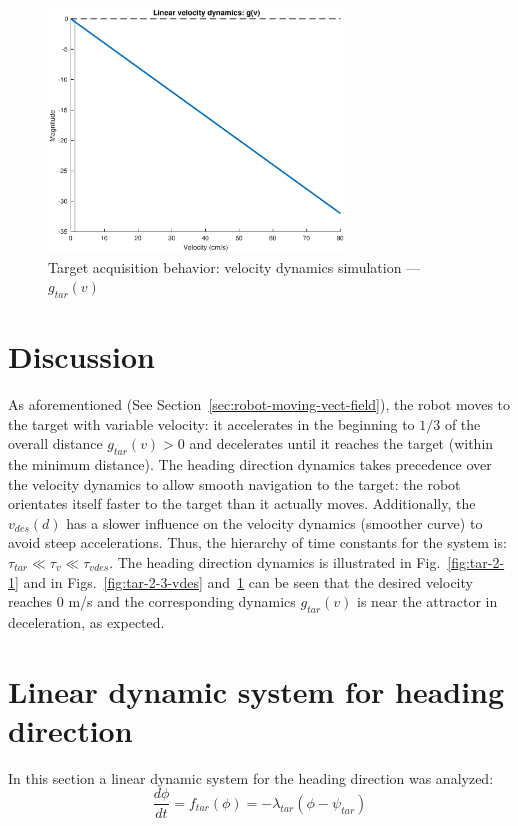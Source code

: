 %
\begin{figure}[!hbt]
\centering
    \includegraphics[width=0.7\textwidth]{./img/2-3-g-v.eps}
  \caption{Target acquisition behavior: velocity dynamics simulation ---
    $g_{tar} (v)$}%
\label{fig:tar-2-3-g-v}
\end{figure}
%
\section{Discussion}%
\label{sec:discussion-tar-nonl}
As aforementioned (See Section~\ref{sec:robot-moving-vect-field}), the robot
moves to the target with variable velocity: it accelerates in the beginning to
$1/3$ of the overall distance $g_{tar}(v) > 0$ and decelerates until it reaches
the target (within the minimum distance).
The heading direction dynamics takes precedence
over the velocity dynamics to allow smooth navigation to the target: the robot
orientates itself faster to the target than it actually moves. 
Additionally, the $v_{des}(d)$ has a slower influence on the
velocity dynamics (smoother curve) to avoid steep accelerations.
Thus, the hierarchy of time constants for the system is: $\tau_{tar} \ll \tau_{v}
\ll \tau_{vdes}$.
The heading direction dynamics is illustrated in Fig.~\ref{fig:tar-2-1} and
in Figs.~\ref{fig:tar-2-3-vdes} and~\ref{fig:tar-2-3-g-v} can
be seen that the desired velocity reaches $0$ m/s and the corresponding dynamics
$g_{tar}(v)$ is near the attractor in deceleration, as expected.

\section{Linear dynamic system for heading direction}%
\label{sec:line-dynam-syst}
In this section a linear dynamic system for the heading direction was analyzed:
\begin{equation}
  \label{eq:19}
  \frac{d \phi}{dt} = f_{tar}(\phi) = - \lambda_{tar}(\phi - \psi_{tar})
\end{equation}

